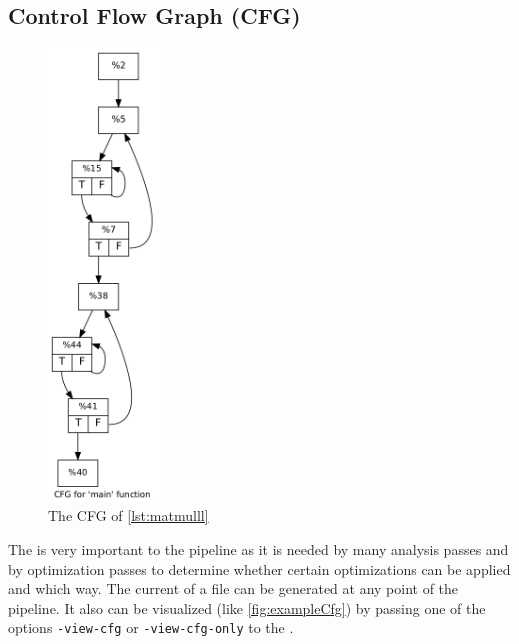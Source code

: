 \subsection{Control Flow Graph (CFG)}\label{subsec:cfg}
\begin{figure}
    \caption{The CFG of \autoref{lst:matmulll}}
    \label{fig:exampleCfg}
    \includegraphics[height=12cm]{gfx/matmulCfg.png}
\end{figure}
The \cfg is very important to the pipeline as it is needed by many analysis passes and by optimization passes to determine whether certain optimizations can be applied and which way.
The current \cfg of a \llvmir file can be generated at any point of the pipeline.
It also can be visualized (like \autoref{fig:exampleCfg}) by passing one of the options \texttt{-view-cfg} or \texttt{-view-cfg-only} to the \opt.
